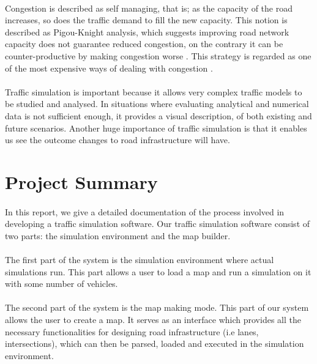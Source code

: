 \documentclass[a4paper,11pt,titlepage]{article}
\begin{document}
\paragraph{}
Congestion is described as self managing, that is; as the capacity of the road increases, so does the traffic demand to fill the new capacity. This notion is described as Pigou-Knight analysis, which suggests improving road network capacity does not guarantee reduced congestion, on the contrary it can be counter-productive by making congestion worse \cite{1,2}. This strategy is regarded as one of the most expensive ways of dealing with congestion \cite{2}.
\paragraph{}
Traffic simulation is important because it allows very complex traffic models to be studied and analysed. In situations where evaluating analytical and numerical data is not sufficient enough, it provides a visual description, of both existing and future scenarios. Another huge importance of traffic simulation is that it enables us see the outcome changes to road infrastructure will have.

\section{Project Summary}
\paragraph{}
In this report, we give a detailed documentation of the process involved in developing a traffic simulation software. Our traffic simulation software consist of two parts: the simulation environment and the map builder. 
\paragraph{}
The first part of the system is the simulation environment where actual simulations run. This part allows a user to load a map and run a simulation on it with some number of vehicles. 
\paragraph{}
The second part of the system is the map making mode. This part of our system allows the user to create a map. It serves as an interface which provides all the necessary functionalities for designing road infrastructure (i.e lanes, intersections), which can then be parsed, loaded and executed in the simulation environment.
\end{document}
